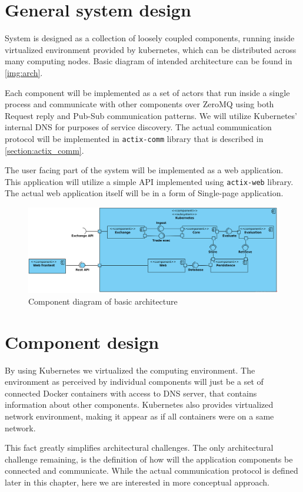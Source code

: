 \section{General system design}
System is designed as a collection of loosely coupled components, running inside virtualized environment provided by kubernetes, which
can be distributed across many computing nodes. Basic diagram of intended architecture can be found in \autoref{img:arch}.

Each component will be implemented as a set of actors that run inside a single process and communicate with other components
over ZeroMQ using both Request reply and Pub-Sub communication patterns. We will utilize Kubernetes' internal DNS for purposes of
service discovery. The actual communication protocol will be implemented in \verb|actix-comm| library that is described in \autoref{section:actix_comm}.

The user facing part of the system will be implemented as a web application. This application will utilize a simple API implemented
using \verb|actix-web| library. The actual web application itself will be in a form of Single-page application.

\begin{figure}[H]
    \includegraphics[width=\textwidth]{obrazky-figures/comp.png}
    \caption{Component diagram of basic architecture}
    \label{img:arch}
\end{figure}


\section{Component design}
By using Kubernetes we virtualized the computing environment. The environment as perceived by individual components
will just be a set of connected Docker containers with access to DNS server, that contains information about other components.
Kubernetes also provides virtualized network environment, making it appear as if all containers were on a same network.

This fact greatly simplifies architectural challenges. The only architectural challenge remaining, is the definition
of how will the application components be connected and communicate. While the actual communication protocol is
defined later in this chapter, here we are interested in more conceptual approach.

